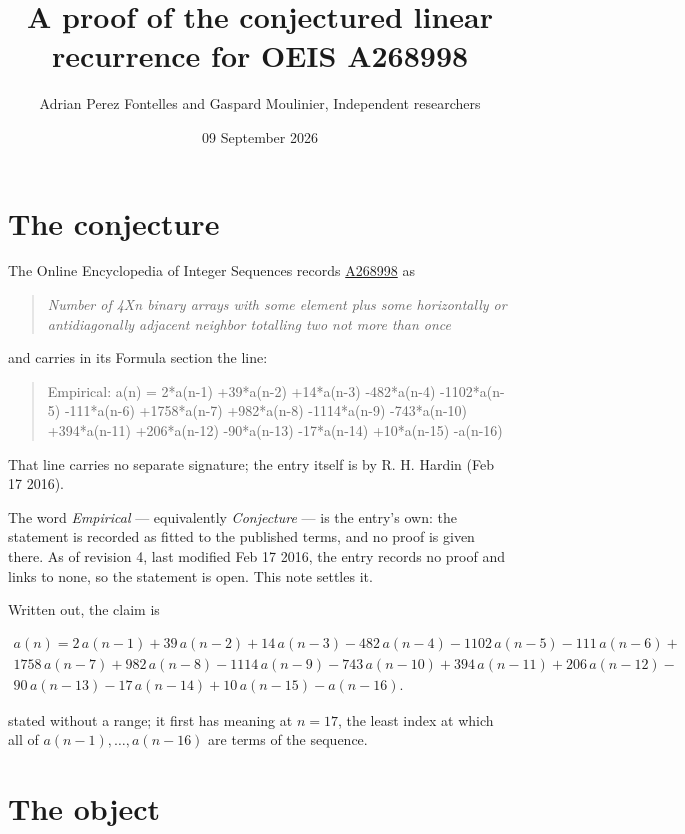 \documentclass[11pt]{article}
\title{A proof of the conjectured linear recurrence for OEIS A268998}
\author{Adrian Perez Fontelles and Gaspard Moulinier, Independent researchers}
\date{09 September 2026}
\theoremstyle{definition}
\begin{document}
\maketitle
\section{The conjecture}

The Online Encyclopedia of Integer Sequences records \href{https://oeis.org/A268998}{A268998} as

\begin{quote}\itshape Number of 4Xn binary arrays with some element plus some horizontally or antidiagonally adjacent neighbor totalling two not more than once\end{quote}

and carries in its Formula section the line:

\begin{quote}\ttfamily Empirical: a(n) = 2*a(n-1) +39*a(n-2) +14*a(n-3) -482*a(n-4) -1102*a(n-5) -111*a(n-6) +1758*a(n-7) +982*a(n-8) -1114*a(n-9) -743*a(n-10) +394*a(n-11) +206*a(n-12) -90*a(n-13) -17*a(n-14) +10*a(n-15) -a(n-16)\end{quote}

That line carries no separate signature; the entry itself is by R. H. Hardin (Feb 17 2016).

The word {\itshape Empirical} --- equivalently {\itshape Conjecture} --- is the entry's own: the statement is recorded as fitted to the published terms, and no proof is given there. As of revision 4, last modified Feb 17 2016, the entry records no proof and links to none, so the statement is open. This note settles it.

Written out, the claim is

\begin{multline*} a(n) = 2\,a(n-1) + 39\,a(n-2) + 14\,a(n-3) - 482\,a(n-4) - 1102\,a(n-5) - 111\,a(n-6) + \\ 1758\,a(n-7) + 982\,a(n-8) - 1114\,a(n-9) - 743\,a(n-10) + 394\,a(n-11) + 206\,a(n-12) - \\ 90\,a(n-13) - 17\,a(n-14) + 10\,a(n-15) - a(n-16). \end{multline*}

stated without a range; it first has meaning at $n = 17$, the least index at which all of $a(n-1),\dots,a(n-16)$ are terms of the sequence.

\section{The object}
\end{document}
